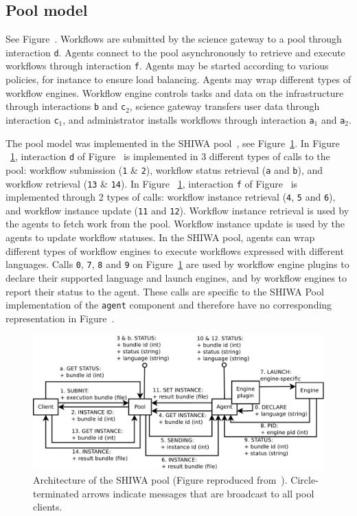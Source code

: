 \documentclass[preprint,3p,twocolumn]{elsarticle}
\begin{document}
\subsection{Pool model}
\label{sec:pool}
See Figure~. Workflows are submitted by the science
gateway to a pool through interaction \texttt{d}. Agents connect to
the pool asynchronously to retrieve and execute workflows through
interaction \texttt{f}. Agents may be started according to various
policies, for instance to ensure load balancing. Agents may wrap
different types of workflow engines. Workflow engine controls tasks
and data on the infrastructure through interactions \texttt{b} and
\texttt{c$_2$}, science gateway transfers user data through
interaction \texttt{c$_1$}, and administrator installs workflows
through interaction \texttt{a$_1$} and \texttt{a$_2$}.

The pool model was implemented in the SHIWA pool~\cite{ROGE-13}, see
Figure~\ref{fig:shiwa-pool-architecture}. In Figure
~\ref{fig:shiwa-pool-architecture}, interaction \texttt{d} of
Figure~ is implemented in 3 different types of calls
to the pool: workflow submission (\texttt{1} \& \texttt{2}), workflow
status retrieval (\texttt{a} and \texttt{b}), and workflow retrieval
(\texttt{13} \& \texttt{14}). In Figure
~\ref{fig:shiwa-pool-architecture}, interaction \texttt{f} of
Figure~ is implemented through 2 types of calls:
workflow instance retrieval (\texttt{4}, \texttt{5} and \texttt{6}),
and workflow instance update (\texttt{11} and \texttt{12}). Workflow
instance retrieval is used by the agents to fetch work from the
pool. Workflow instance update is used by the agents to update
workflow statuses. In the SHIWA pool, agents can wrap different types
of workflow engines to execute workflows expressed with different
languages. Calls \texttt{0}, \texttt{7}, \texttt{8} and \texttt{9} on
Figure~\ref{fig:shiwa-pool-architecture} are used by workflow engine
plugins to declare their supported language and launch engines, and by
workflow engines to report their status to the agent. These calls are
specific to the SHIWA Pool implementation of the \texttt{agent}
component and therefore have no corresponding representation in
Figure~.

\begin{figure}
\centering
\includegraphics[width=1.5\columnwidth]{figures/pool-interactions.pdf}
\caption{Architecture of the SHIWA pool (Figure reproduced
  from~\cite{ROGE-13}). Circle-terminated arrows indicate messages
  that are broadcast to all pool clients.}
\label{fig:shiwa-pool-architecture}
\end{figure}
\end{document}
